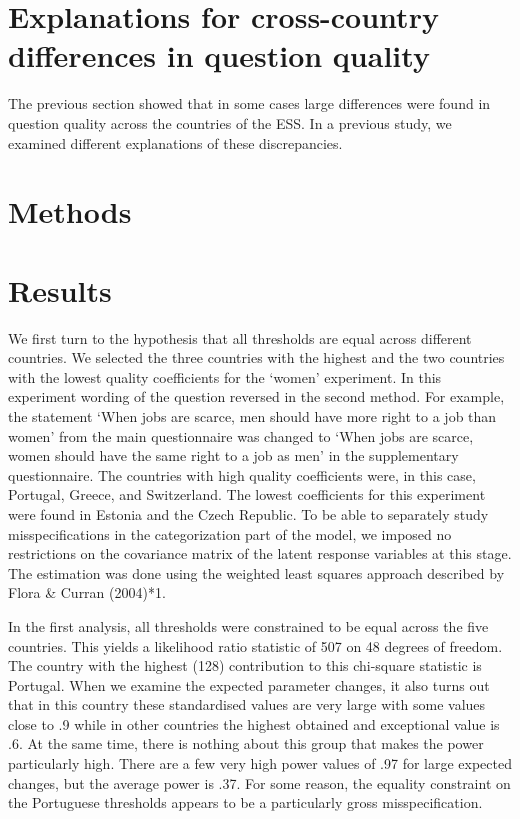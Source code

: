 \documentclass[a4paper,12pt]{article}
\begin{document}
\section{Explanations for cross-country differences in question quality}

The previous section showed that in some cases large differences were found in question quality across the countries of the ESS. In a previous study, we examined different explanations of these discrepancies.


\section{Methods}


\section{Results}

We first turn to the hypothesis that all thresholds are equal across different countries. We selected the three countries with the highest and the two countries with the lowest quality coefficients for the `women' experiment. In this experiment wording of the question reversed in the second method. For example, the statement `When jobs are scarce, men should have more right to a job than women' from the main questionnaire was changed to `When jobs are scarce, women should have the same right to a job as men' in the supplementary questionnaire. The countries with high quality coefficients were, in this case, Portugal, Greece, and Switzerland. The lowest coefficients for this experiment were found in Estonia and the Czech Republic. To be able to separately study misspecifications in the categorization part of the model, we imposed no restrictions on the covariance matrix of the latent response variables at this stage. The estimation was done using the weighted least squares approach described by Flora \& Curran (2004)*1.

In the first analysis, all thresholds were constrained to be equal across the five countries. This yields a likelihood ratio statistic of 507 on 48 degrees of freedom. The country with the highest (128) contribution to this chi-square statistic is Portugal. When we examine the expected parameter changes, it also turns out that in this country these standardised values are very large with some values close to .9 while in other countries the highest obtained and exceptional value is .6. At the same time, there is nothing about this group that makes the power particularly high. There are a few very high power values of .97 for large expected changes, but the average power is .37. For some reason, the equality constraint on the Portuguese thresholds appears to be a particularly gross misspecification.
\end{document}
